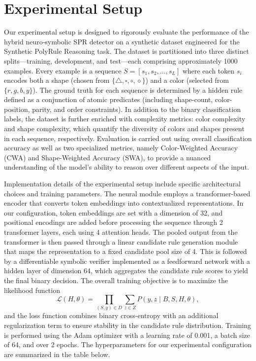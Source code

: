 \documentclass{article}
\begin{document}
\section{Experimental Setup}
Our experimental setup is designed to rigorously evaluate the performance of the hybrid neuro‐symbolic SPR detector on a synthetic dataset engineered for the Synthetic PolyRule Reasoning task. The dataset is partitioned into three distinct splits—training, development, and test—each comprising approximately 1000 examples. Every example is a sequence \( S = [s_1, s_2, \ldots, s_L] \) where each token \( s_i \) encodes both a shape (chosen from \(\{\triangle, \square, \circ, \diamond\}\)) and a color (selected from \(\{r, g, b, y\}\)). The ground truth for each sequence is determined by a hidden rule defined as a conjunction of atomic predicates (including shape-count, color-position, parity, and order constraints). In addition to the binary classification labels, the dataset is further enriched with complexity metrics: color complexity and shape complexity, which quantify the diversity of colors and shapes present in each sequence, respectively. Evaluation is carried out using overall classification accuracy as well as two specialized metrics, namely Color-Weighted Accuracy (CWA) and Shape-Weighted Accuracy (SWA), to provide a nuanced understanding of the model's ability to reason over different aspects of the input.

Implementation details of the experimental setup include specific architectural choices and training parameters. The neural module employs a transformer-based encoder that converts token embeddings into contextualized representations. In our configuration, token embeddings are set with a dimension of 32, and positional encodings are added before processing the sequence through 2 transformer layers, each using 4 attention heads. The pooled output from the transformer is then passed through a linear candidate rule generation module that maps the representation to a fixed candidate pool size of 4. This is followed by a differentiable symbolic verifier implemented as a feedforward network with a hidden layer of dimension 64, which aggregates the candidate rule scores to yield the final binary decision. The overall training objective is to maximize the likelihood function
\[
\mathcal{L}(H,\theta)=\prod_{(S,y)\in D}\sum_{z\in Z} P(y,z \mid B,S,H,\theta),
\]
and the loss function combines binary cross-entropy with an additional regularization term to ensure stability in the candidate rule distribution. Training is performed using the Adam optimizer with a learning rate of 0.001, a batch size of 64, and over 2 epochs. The hyperparameters for our experimental configuration are summarized in the table below.
\end{document}
